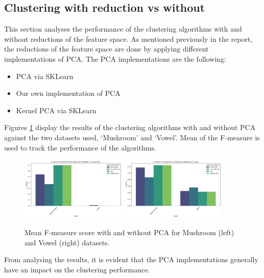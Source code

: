 \subsection{Clustering with reduction vs without}
\label{subsec:clustering-with-reduction-vs-without}

This section analyses the performance of the clustering algorithms with and without reductions of the feature space.
As mentioned previously in the report, the reductions of the feature space are done by applying different
implementations of PCA. The PCA implementations are the following:

\begin{itemize}
    \item PCA via SKLearn
    \item Our own implementation of PCA
    \item Kernel PCA via SKLearn
\end{itemize}

Figures \ref{fig:clustering-results} display the results of the clustering algorithms
with and without PCA against the two datasets used, `Mushroom' and `Vowel'.
Mean of the F-measure is used to track the performance of the algorithms.

\begin{figure}[!h]
    \centering
    \includegraphics[width=0.45\textwidth]{figures/f_measure_comparison_mushroom.png}
    \includegraphics[width=0.45\textwidth]{figures/f_measure_comparison_vowel.png}
    \caption{Mean F-measure score with and without PCA for Mushroom (left) and Vowel (right) datasets.}
\label{fig:clustering-results}
\end{figure}


From analysing the results, it is evident that the PCA implementations generally have an 
impact on the clustering performance.


